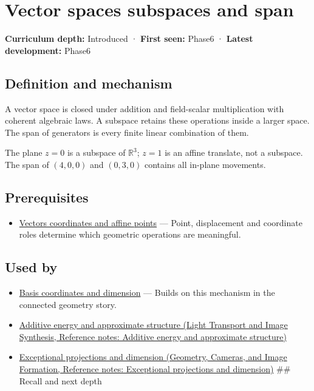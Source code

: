 \hypertarget{appendix-173b52c063ae}{}\label{referencestart:appendix-173b52c063ae}
\section{Vector spaces subspaces and span}\label{appendix-173b52c063ae-vector-spaces-subspaces-and-span}

\textbf{Curriculum depth:} Introduced · \textbf{First seen:} Phase6 · \textbf{Latest development:} Phase6

\begin{allmightroledefinition}

\subsection{Definition and mechanism}\label{appendix-173b52c063ae-definition-and-mechanism}

A vector space is closed under addition and field-scalar multiplication with coherent algebraic laws. A subspace retains these operations inside a larger space. The span of generators is every finite linear combination of them.

\end{allmightroledefinition}

The plane \(z=0\) is a subspace of \(\mathbb R^3\); \(z=1\) is an affine translate, not a subspace. The span of \((4,0,0)\) and \((0,3,0)\) contains all in-plane movements.

\subsection{Prerequisites}\label{appendix-173b52c063ae-prerequisites}

\begin{itemize}
\tightlist
\item
  \hyperref[appendix-0659864c0aa3]{Vectors coordinates and affine points} --- Point, displacement and coordinate roles determine which geometric operations are meaningful.
\end{itemize}

\subsection{Used by}\label{appendix-173b52c063ae-used-by}

\begin{itemize}
\item
  \hyperref[appendix-ce0341f7ea0d]{Basis coordinates and dimension} --- Builds on this mechanism in the connected geometry story.
\item
  \href{../04-Light-Transport-and-Image-Synthesis/main.pdf\#nameddest=appendix-b0732b22e7d6}{Additive energy and approximate structure (Light Transport and Image Synthesis, Reference notes: Additive energy and approximate structure)}
\item
  \href{../03-Geometry-Cameras-and-Image-Formation/main.pdf\#nameddest=appendix-3c73f7862157}{Exceptional projections and dimension (Geometry, Cameras, and Image Formation, Reference notes: Exceptional projections and dimension)} \#\# Recall and next depth
\end{itemize}

